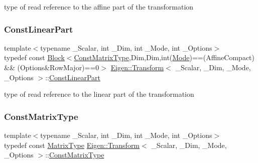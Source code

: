 type of read reference to the affine part of the transformation \mbox{\label{class_eigen_1_1_transform_ac3327ee95457c915e422ff85002e02aa}} 
\subsubsection{\texorpdfstring{ConstLinearPart}{ConstLinearPart}}
{\footnotesize\ttfamily template$<$typename \+\_\+\+Scalar, int \+\_\+\+Dim, int \+\_\+\+Mode, int \+\_\+\+Options$>$ \\
typedef const \mbox{\hyperlink{class_eigen_1_1_block}{Block}}$<$\mbox{\hyperlink{class_eigen_1_1_transform_aed436d14b16bd862bac5367990085795}{Const\+Matrix\+Type}},Dim,Dim,int(\mbox{\hyperlink{struct_mode}{Mode}})==(Affine\+Compact) \&\& (Options\&Row\+Major)==0$>$ \mbox{\hyperlink{class_eigen_1_1_transform}{Eigen\+::\+Transform}}$<$ \+\_\+\+Scalar, \+\_\+\+Dim, \+\_\+\+Mode, \+\_\+\+Options $>$\+::\mbox{\hyperlink{class_eigen_1_1_transform_ac3327ee95457c915e422ff85002e02aa}{Const\+Linear\+Part}}}

type of read reference to the linear part of the transformation \mbox{\label{class_eigen_1_1_transform_aed436d14b16bd862bac5367990085795}} 
\subsubsection{\texorpdfstring{ConstMatrixType}{ConstMatrixType}}
{\footnotesize\ttfamily template$<$typename \+\_\+\+Scalar, int \+\_\+\+Dim, int \+\_\+\+Mode, int \+\_\+\+Options$>$ \\
typedef const \mbox{\hyperlink{class_eigen_1_1_transform_a30f72ba46abc2bb3c7fa919c1078fc9c}{Matrix\+Type}} \mbox{\hyperlink{class_eigen_1_1_transform}{Eigen\+::\+Transform}}$<$ \+\_\+\+Scalar, \+\_\+\+Dim, \+\_\+\+Mode, \+\_\+\+Options $>$\+::\mbox{\hyperlink{class_eigen_1_1_transform_aed436d14b16bd862bac5367990085795}{Const\+Matrix\+Type}}}

